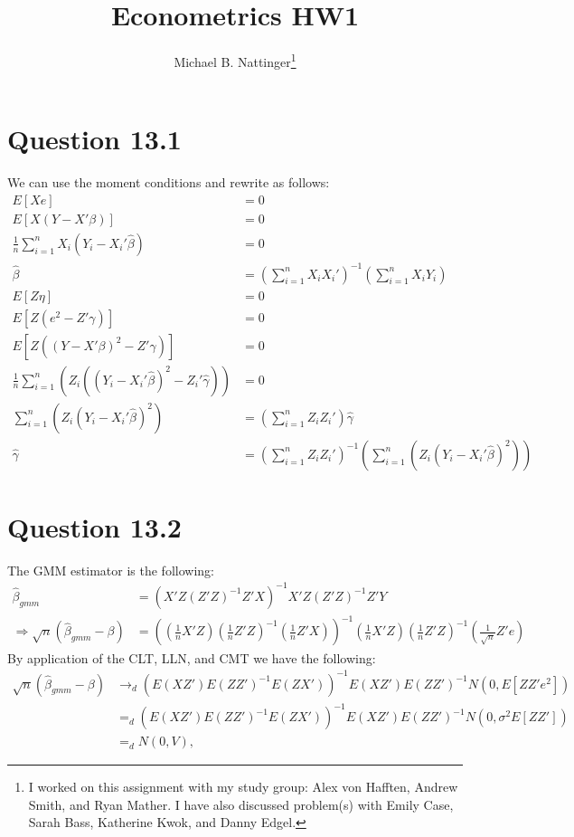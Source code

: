 \documentclass[11pt]{article} %
\title{Econometrics HW1}
\author{Michael B. Nattinger\footnote{I worked on this assignment with my study group: Alex von Hafften, Andrew Smith, and Ryan Mather. I have also discussed problem(s) with Emily Case, Sarah Bass, Katherine Kwok, and Danny Edgel.}}
\begin{document}
\maketitle

\section{Question 13.1}
We can use the moment conditions and rewrite as follows:
\begin{align*}
E[Xe] &= 0\\
E[X(Y-X'\beta)] &= 0\\
\frac{1}{n}\sum_{i=1}^nX_i(Y_i - X_i'\hat{\beta}) &= 0\\
\hat{\beta} &= \left( \sum_{i=1}^n X_i X_i'\right)^{-1}\left( \sum_{i=1}^n X_i Y_i\right)\\
E[Z\eta] &= 0\\
E[Z(e^2 - Z'\gamma)] &= 0\\
E[Z((Y - X'\beta)^2 - Z'\gamma)] &= 0\\
\frac{1}{n}\sum_{i=1}^n \left(Z_i((Y_i - X_i'\hat{\beta})^2 - Z_i'\hat{\gamma}) \right) &= 0\\
\sum_{i=1}^n \left(Z_i(Y_i - X_i'\hat{\beta})^2\right) &=  \left(\sum_{i=1}^n Z_iZ_i' \right)\hat{\gamma}\\
\hat{\gamma} &= \left( \sum_{i=1}^n Z_iZ_i'  \right)^{-1}\left(\sum_{i=1}^n \left(Z_i(Y_i - X_i'\hat{\beta})^2\right) \right)
\end{align*}
\section{Question 13.2}
The GMM estimator is the following:
\begin{align*}
\hat{\beta}_{gmm} &= \left( X'Z(Z'Z)^{-1}Z'X\right)^{-1}X'Z(Z'Z)^{-1}Z'Y\\
\Rightarrow \sqrt{n} (\hat{\beta}_{gmm} - \beta) &= \left( \left(\frac{1}{n} X'Z\right)\left(\frac{1}{n}Z'Z\right)^{-1}\left(\frac{1}{n}Z'X\right)\right)^{-1}\left(\frac{1}{n}X'Z\right)\left(\frac{1}{n}Z'Z\right)^{-1}\left(\frac{1}{\sqrt{n}}Z'e\right)
\end{align*}
By application of the CLT, LLN, and CMT we have the following:
\begin{align*}
\sqrt{n} (\hat{\beta}_{gmm} - \beta) &\rightarrow_d \left( E\left( XZ'\right)E\left(ZZ'\right)^{-1}E\left(ZX'\right)\right)^{-1}E\left(XZ'\right)E\left(ZZ'\right)^{-1}N(0,E[ZZ'e^2]) \\
&=_d \left( E\left( XZ'\right)E\left(ZZ'\right)^{-1}E\left(ZX'\right)\right)^{-1}E\left(XZ'\right)E\left(ZZ'\right)^{-1}N(0,\sigma^2E[ZZ'])\\
&=_d N(0,V),
\end{align*}
\end{document}
